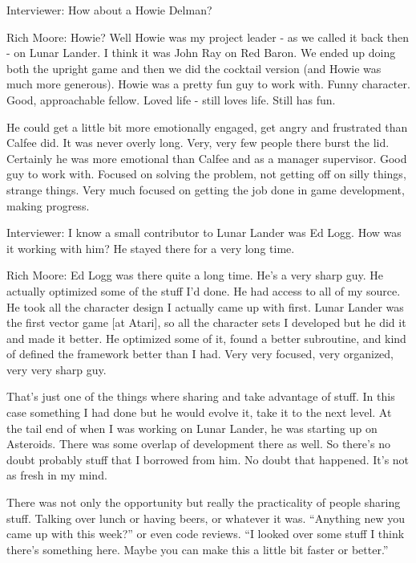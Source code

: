 \textcolor{interviewer}{Interviewer:} How about a Howie Delman?

\textcolor{interviewee}{Rich Moore:} Howie? Well Howie was my project leader - as we called it back then - on Lunar Lander. I think it was John Ray on Red Baron. We ended up doing both the upright game and then we did the cocktail version (and Howie was much more generous). Howie was a pretty fun guy to work with. Funny character. Good, approachable fellow. Loved life - still loves life. Still has fun. 

He could get a little bit more emotionally engaged, get angry and frustrated than Calfee did. It was never overly long. Very, very few people there burst the lid. Certainly he was more emotional than Calfee and as a manager supervisor. Good guy to work with. Focused on solving the problem, not getting off on silly things, strange things. Very much focused on getting the job done in game development, making progress.

\textcolor{interviewer}{Interviewer:} I know a small contributor to Lunar Lander was Ed Logg. How was it working with him? He stayed there for a very long time.

\textcolor{interviewee}{Rich Moore:} Ed Logg was there quite a long time. He’s a very sharp guy. He actually optimized some of the stuff I'd done. He had access to all of my source. He took all the character design I actually came up with first. Lunar Lander was the first vector game [at Atari], so all the character sets I developed but he did it and made it better. He optimized some of it, found a better subroutine, and kind of defined the framework better than I had. Very very focused, very organized, very very sharp guy. 

That’s just one of the things where sharing and take advantage of stuff. In this case something I had done but he would evolve it, take it to the next level. At the tail end of when I was working on Lunar Lander, he was starting up on Asteroids. There was some overlap of development there as well. So there's no doubt probably stuff that I borrowed from him. No doubt that happened. It’s not as fresh in my mind.

There was not only the opportunity but really the practicality of people sharing stuff. Talking over lunch or having beers, or whatever it was. “Anything new you came up with this week?” or even code reviews. “I looked over some stuff I think there's something here. Maybe you can make this a little bit faster or better.”

